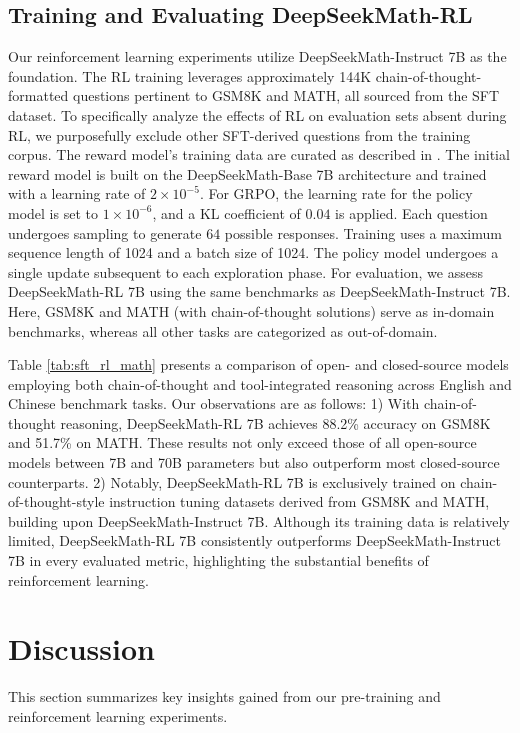 \begin{itemize}[topsep=0pt]
\begin{itemize}[topsep=0pt]
\subsection{Training and Evaluating DeepSeekMath-RL}

Our reinforcement learning experiments utilize DeepSeekMath-Instruct 7B as the foundation. The RL training leverages approximately 144K chain-of-thought-formatted questions pertinent to GSM8K and MATH, all sourced from the SFT dataset. To specifically analyze the effects of RL on evaluation sets absent during RL, we purposefully exclude other SFT-derived questions from the training corpus. The reward model's training data are curated as described in \citep{wang2023math}. The initial reward model is built on the DeepSeekMath-Base 7B architecture and trained with a learning rate of $2 \times 10^{-5}$. For GRPO, the learning rate for the policy model is set to $1 \times 10^{-6}$, and a KL coefficient of $0.04$ is applied. Each question undergoes sampling to generate $64$ possible responses. Training uses a maximum sequence length of 1024 and a batch size of 1024. The policy model undergoes a single update subsequent to each exploration phase. For evaluation, we assess DeepSeekMath-RL 7B using the same benchmarks as DeepSeekMath-Instruct 7B. Here, GSM8K and MATH (with chain-of-thought solutions) serve as in-domain benchmarks, whereas all other tasks are categorized as out-of-domain.

Table \ref{tab:sft_rl_math} presents a comparison of open- and closed-source models employing both chain-of-thought and tool-integrated reasoning across English and Chinese benchmark tasks. Our observations are as follows: 1) With chain-of-thought reasoning, DeepSeekMath-RL 7B achieves 88.2\% accuracy on GSM8K and 51.7\% on MATH. These results not only exceed those of all open-source models between 7B and 70B parameters but also outperform most closed-source counterparts. 2) Notably, DeepSeekMath-RL 7B is exclusively trained on chain-of-thought-style instruction tuning datasets derived from GSM8K and MATH, building upon DeepSeekMath-Instruct 7B. Although its training data is relatively limited, DeepSeekMath-RL 7B consistently outperforms DeepSeekMath-Instruct 7B in every evaluated metric, highlighting the substantial benefits of reinforcement learning.

\section{Discussion}
This section summarizes key insights gained from our pre-training and reinforcement learning experiments.


\end{itemize}
\end{itemize}

